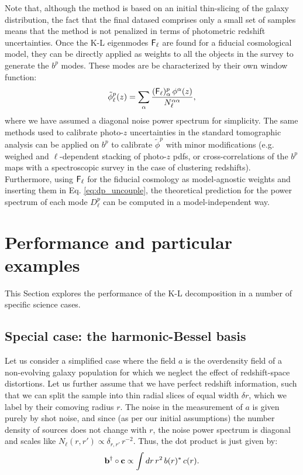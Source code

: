 \documentclass[twocolumn,amsfont,amssymb,amsmath, showpacs,balancelastpage, nofootinbib]{revtex4-1}
\begin{document}
    Note that, although the method is based on an initial thin-slicing of the galaxy distribution, the fact that the final datased comprises only a small set of samples means that the method is not penalized in terms of photometric redshift uncertainties. Once the K-L eigenmodes ${\sf F}_\ell$ are found for a fiducial cosmological model, they can be directly applied as weights to all the objects in the survey to generate the $b^p$ modes. These modes are be characterized by their own window function:
    \begin{equation}
     \tilde{\phi}_\ell^p(z)=\sum_\alpha \frac{({\sf F}_\ell)^p_\alpha\,\phi^\alpha(z)}{N^{\alpha\alpha}_\ell},
    \end{equation}
    where we have assumed a diagonal noise power spectrum for simplicity.
    The same methods used to calibrate photo-$z$ uncertainties in the standard tomographic analysis can be applied on $b^p$ to calibrate $\tilde{\phi}^p$ with minor modifications (e.g. weighed and $\ell$-dependent stacking of photo-$z$ pdfs, or cross-correlations of the $b^p$ maps with a spectroscopic survey in the case of clustering redshifts). Furthermore, using ${\sf F}_\ell$ for the fiducial cosmology as model-agnostic weights and inserting them in Eq. \ref{eq:dp_uncouple}, the theoretical prediction for the power spectrum of each mode $D^p_\ell$ can be computed in a model-independent way.

\section{Performance and particular examples}\label{sec:results}
  This Section explores the performance of the K-L decomposition in a number of specific science cases.
  
  \subsection{Special case: the harmonic-Bessel basis}\label{ssec:results.bessel}
    Let us consider a simplified case where the field $a$ is the overdensity field of a non-evolving galaxy population for which we neglect the effect of redshift-space distortions. Let us further assume that we have perfect redshift information, such that we can split the sample into thin radial slices of equal width $\delta r$, which we label by their comoving radius $r$. The noise in the measurement of $a$ is given purely by shot noise, and since (as per our initial assumptions) the number density of sources does not change with $r$, the noise power spectrum is diagonal and scales like $N_\ell(r,r')\propto \delta_{r,r'}\,r^{-2}$. Thus, the dot product is just given by:
    \begin{equation}
      {\bf b}^\dag\circ{\bf c}\propto\int dr\,r^2\,b(r)^*\,c(r).
    \end{equation}
   
\end{document}
